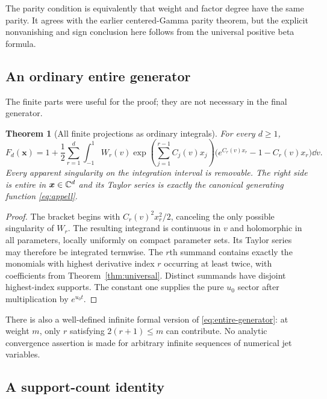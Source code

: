 \documentclass[11pt,letterpaper]{article}
\numberwithin{equation}{section}
\theoremstyle{plain}
\newtheorem{theorem}{Theorem}[section]
\theoremstyle{definition}
\theoremstyle{remark}
\begin{document}
The parity condition is equivalently that weight and factor degree have the same parity. It agrees with the earlier centered-Gamma parity theorem, but the explicit nonvanishing and sign conclusion here follows from the universal positive beta formula.

\subsection{An ordinary entire generator}

The finite parts were useful for the proof; they are not necessary in the final generator.

\begin{theorem}[All finite projections as ordinary integrals]\label{thm:entire}
For every $d\ge1$,
\begin{equation}\label{eq:entire-generator}
 \boxed{\displaystyle
 F_d(\boldsymbol x)=1+\frac12\sum_{r=1}^d\int_{-1}^1
 W_r(v)\exp\left(\sum_{j=1}^{r-1}C_j(v)x_j\right)
 \bigl(e^{C_r(v)x_r}-1-C_r(v)x_r\bigr)\dd v.}
\end{equation}
Every apparent singularity on the integration interval is removable. The right side is entire in $\boldsymbol x\in\mathbb C^d$ and its Taylor series is exactly the canonical generating function \eqref{eq:appell}.
\end{theorem}
\begin{proof}
The bracket begins with $C_r(v)^2x_r^2/2$, canceling the only possible singularity of $W_r$. The resulting integrand is continuous in $v$ and holomorphic in all parameters, locally uniformly on compact parameter sets. Its Taylor series may therefore be integrated termwise. The $r$th summand contains exactly the monomials with highest derivative index $r$ occurring at least twice, with coefficients from Theorem~\ref{thm:universal}. Distinct summands have disjoint highest-index supports. The constant one supplies the pure $u_0$ sector after multiplication by $e^{u_0t}$.
\end{proof}

There is also a well-defined infinite formal version of \eqref{eq:entire-generator}: at weight $m$, only $r$ satisfying $2(r+1)\le m$ can contribute. No analytic convergence assertion is made for arbitrary infinite sequences of numerical jet variables.

\subsection{A support-count identity}
\end{document}
